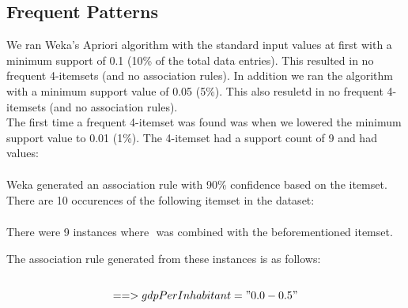 \subsection{Frequent Patterns}
\label{Res_FP}
We ran Weka's Apriori algorithm with the standard input values at first with a minimum support of 0.1 (10\% of the total data entries). This resulted in no frequent 4-itemsets (and no association rules). In addition we ran the algorithm with a minimum support value of 0.05 (5\%). This also resuletd in no frequent 4-itemsets (and no association rules).
\\The first time a frequent 4-itemset was found was when we lowered the minimum support value to 0.01 (1\%). The 4-itemset had a support count of 9 and had values:
\begin{align*}
	[unemploymentRate="2.0-2.5"; \\
	balanceOfPayments="1.0-1.5"; \\
	gdpPerInhabitant="0.0-0.5"; \\
	population="0.0-0.5"]
\end{align*}

Weka generated an association rule with 90\% confidence based on the itemset. 
\\There are 10 occurences of the following itemset in the dataset:
\begin{align*}
	[unemploymentRate="2.0-2.5";\\
	balanceOfPayments="1.0-1.5";\\ 
	population="0.0-0.5"]
\end{align*}

There were 9 instances where \begin{math}[gdpPerInhabitant=0.0-0.5]\end{math} was combined with the beforementioned itemset.

The association rule generated from these instances is as follows:
\begin{align*}
	[unemploymentRate="2.0-2.5";\\
	balanceOfPayments="1.0-1.5";\\ 
	population="0.0-0.5"]
	\\==> gdpPerInhabitant="0.0-0.5"
\end{align*}

